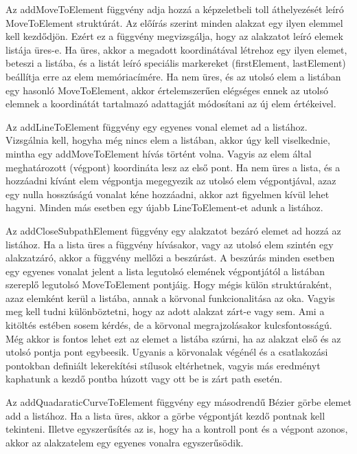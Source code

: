 \documentclass[12pt]{report}
\theoremstyle{definition}
\newcommand{\func}[1]{{\textsf{\footnotesize{#1}}}}
\begin{document}
Az \func{addMoveToElement} függvény adja hozzá a képzeletbeli toll áthelyezését
leíró \func{MoveToElement} struktúrát. Az előírás szerint minden alakzat egy
ilyen elemmel kell kezdődjön. Ezért ez a függvény megvizsgálja, hogy az
alakzatot leíró elemek listája üres-e. Ha üres, akkor a megadott koordinátával
létrehoz egy ilyen elemet, beteszi a listába, és a listát leíró speciális
markereket (\func{firstElement}, \func{lastElement}) beállítja erre az elem
memóriacímére. Ha nem üres, és az utolsó elem a listában egy hasonló
\func{MoveToElement}, akkor értelemszerűen elégséges ennek az utolsó elemnek a
koordinátát tartalmazó adattagját módosítani az új elem értékeivel.

Az \func{addLineToElement} függvény egy egyenes vonal elemet ad a listához.
Vizsgálnia kell, hogyha még nincs elem a listában, akkor úgy kell viselkednie,
mintha egy \func{addMoveToElement} hívás történt volna. Vagyis az elem által
meghatározott (végpont) koordináta lesz az első pont. Ha nem üres a lista, és a
hozzáadni kívánt elem végpontja megegyezik az utolsó elem végpontjával, azaz
egy nulla hosszúságú vonalat kéne hozzáadni, akkor azt figyelmen kívül lehet
hagyni. Minden más esetben egy újabb \func{LineToElement}-et adunk a listához.

Az \func{addCloseSubpathElement} függvény egy alakzatot bezáró elemet ad hozzá
az listához. Ha a lista üres a függvény hívásakor, vagy az utolsó elem szintén
egy alakzatzáró, akkor a függvény mellőzi a beszúrást. A beszúrás minden
esetben egy egyenes vonalat jelent a lista legutolsó elemének végpontjától a
listában szereplő legutolsó \func{MoveToElement} pontjáig. Hogy mégis külön
struktúraként, azaz elemként kerül a listába, annak a körvonal funkcionalitása
az oka. Vagyis meg kell tudni különböztetni, hogy az adott alakzat zárt-e vagy
sem. Ami a kitöltés estében sosem kérdés, de a körvonal megrajzolásakor
kulcsfontosságú. Még akkor is fontos lehet ezt az elemet a listába szúrni, ha
az alakzat első és az utolsó pontja pont egybeesik. Ugyanis a körvonalak
végénél és a csatlakozási pontokban definiált lekerekítési stílusok
eltérhetnek, vagyis más eredményt kaphatunk a kezdő pontba húzott vagy ott be
is zárt path esetén.

Az \func{addQuadaraticCurveToElement} függvény egy másodrendű Bézier görbe
elemet add a listához. Ha a lista üres, akkor a görbe végpontját kezdő pontnak
kell tekinteni. Illetve egyszerűsítés az is, hogy ha a kontroll pont és a
végpont azonos, akkor az alakzatelem egy egyenes vonalra egyszerűsödik.
\end{document}
